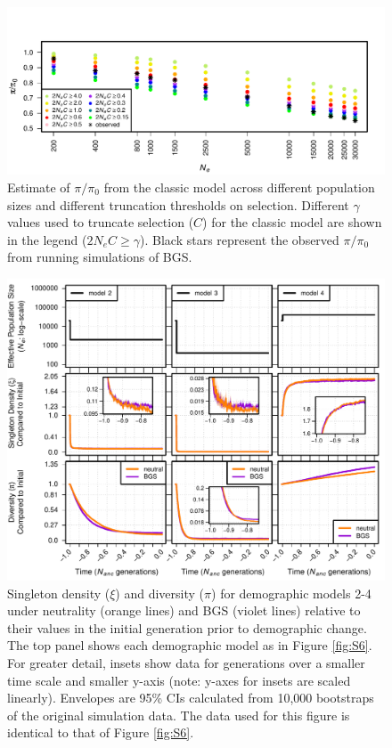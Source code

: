 \documentclass[9pt,twocolumn,twoside]{rilabRxiv}
\begin{document}
\begin{figure}[t]
\includegraphics[width=.9\linewidth]{figures/FigS21.pdf}
\caption{Estimate of $\pi/\pi_0$ from the classic model \citep{nordborg1996effect} across different population sizes and different truncation thresholds on selection.
Different $\gamma$ values used to truncate selection ($C$) for the classic model are shown in the legend ($2N_eC \geq \gamma$).
Black stars represent the observed $\pi/\pi_0$ from running simulations of BGS.}
\label{fig:nordborgsims}
\end{figure}
\pagebreak

\begin{figure}[t]
\includegraphics[width=.9\linewidth]{figures/FigS9.pdf}
\caption{Singleton density ($\xi$) and diversity ($\pi$) for demographic models 2-4 under neutrality (orange lines) and BGS (violet lines) relative to their values in the initial generation prior to demographic change.
The top panel shows each demographic model as in Figure \ref{fig:S6}.
For greater detail, insets show data for generations over a smaller time scale and smaller y-axis (note: y-axes for insets are scaled linearly).
Envelopes are 95\% CIs calculated from 10,000 bootstraps of the original simulation data.
The data used for this figure is identical to that of Figure \ref{fig:S6}.}
\label{fig:S9}
\end{figure}
\pagebreak
\end{document}
